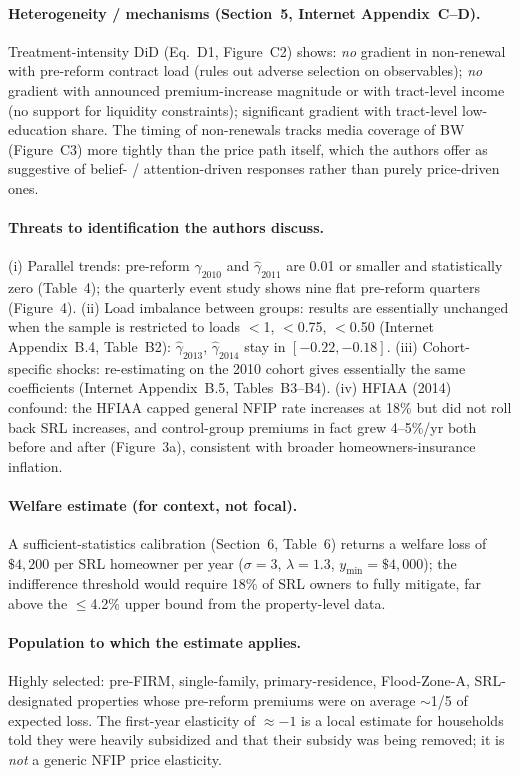 \documentclass[11pt]{article}
\begin{document}
\paragraph{Heterogeneity / mechanisms (Section~5, Internet Appendix~C--D).}
Treatment-intensity DiD (Eq.~D1, Figure~C2) shows: \emph{no} gradient in
non-renewal with pre-reform contract load (rules out adverse selection on
observables); \emph{no} gradient with announced premium-increase magnitude
or with tract-level income (no support for liquidity constraints);
significant gradient with tract-level low-education share. The timing of
non-renewals tracks media coverage of BW (Figure~C3) more tightly than the
price path itself, which the authors offer as suggestive of belief- /
attention-driven responses rather than purely price-driven ones.

\paragraph{Threats to identification the authors discuss.}
(i) Parallel trends: pre-reform $\hat\gamma_{2010}$ and $\hat\gamma_{2011}$
are 0.01 or smaller and statistically zero (Table~4); the quarterly event
study shows nine flat pre-reform quarters (Figure~4).
(ii) Load imbalance between groups: results are essentially unchanged when
the sample is restricted to loads $<$1, $<$0.75, $<$0.50 (Internet
Appendix~B.4, Table~B2): $\hat\gamma_{2013}$, $\hat\gamma_{2014}$ stay in
$[-0.22, -0.18]$.
(iii) Cohort-specific shocks: re-estimating on the 2010 cohort gives
essentially the same coefficients (Internet Appendix~B.5, Tables~B3--B4).
(iv) HFIAA (2014) confound: the HFIAA capped general NFIP rate increases at
18\% but did not roll back SRL increases, and control-group premiums in
fact grew 4--5\%/yr both before and after (Figure~3a), consistent with
broader homeowners-insurance inflation.

\paragraph{Welfare estimate (for context, not focal).}
A sufficient-statistics calibration (Section~6, Table~6) returns a welfare
loss of $\$4{,}200$ per SRL homeowner per year ($\sigma=3$, $\lambda=1.3$,
$y_{\min}=\$4{,}000$); the indifference threshold would require 18\% of SRL
owners to fully mitigate, far above the $\le$4.2\% upper bound from the
property-level data.

\paragraph{Population to which the estimate applies.}
Highly selected: pre-FIRM, single-family, primary-residence, Flood-Zone-A,
SRL-designated properties whose pre-reform premiums were on average
$\sim$1/5 of expected loss. The first-year elasticity of $\approx -1$ is a
local estimate for households told they were heavily subsidized and that
their subsidy was being removed; it is \emph{not} a generic NFIP price
elasticity.
\end{document}
